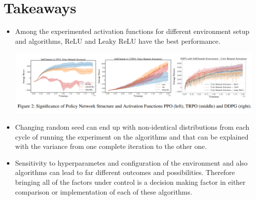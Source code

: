 \documentclass[a4paper,12pt]{article}
\begin{document}
\section{Takeaways}
\begin{itemize}
    \item Among the experimented activation functions for different environment setup and algorithms, ReLU and Leaky ReLU have the best performance.
    
    \includegraphics[width=1\columnwidth]{activation_functions.png}

    \item Changing random seed can end up with non-identical distributions from each cycle of running the experiment on the algorithms and that can be explained with the variance from one complete iteration to the other one.
    
    \item Sensitivity to hyperparametes and configuration of the environment and also algorithms can lead to far different outcomes and possibilities. Therefore bringing all of the factors under control is a decision making factor in either comparison or implementation of each of these algorithms.
 \end{itemize}







\end{document}
